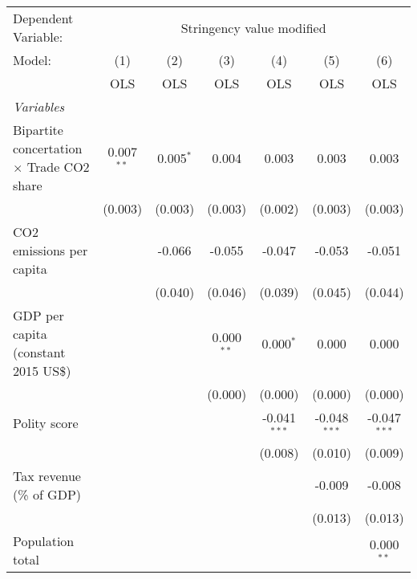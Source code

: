 
\begingroup
\centering
\begin{tabular}{lcccccc}
   \toprule
   Dependent Variable: & \multicolumn{6}{c}{Stringency value modified}\\
   Model:                                           & (1)          & (2)         & (3)          & (4)            & (5)            & (6)\\  
                                                    &  OLS         & OLS         & OLS          & OLS            & OLS            & OLS\\  
   \midrule
   \emph{Variables}\\
   Bipartite concertation $\times$ Trade CO2 share  & 0.007$^{**}$ & 0.005$^{*}$ & 0.004        & 0.003          & 0.003          & 0.003\\   
                                                    & (0.003)      & (0.003)     & (0.003)      & (0.002)        & (0.003)        & (0.003)\\   
   CO2 emissions per capita                         &              & -0.066      & -0.055       & -0.047         & -0.053         & -0.051\\   
                                                    &              & (0.040)     & (0.046)      & (0.039)        & (0.045)        & (0.044)\\   
   GDP per capita (constant 2015 US\$)              &              &             & 0.000$^{**}$ & 0.000$^{*}$    & 0.000          & 0.000\\   
                                                    &              &             & (0.000)      & (0.000)        & (0.000)        & (0.000)\\   
   Polity score                                     &              &             &              & -0.041$^{***}$ & -0.048$^{***}$ & -0.047$^{***}$\\   
                                                    &              &             &              & (0.008)        & (0.010)        & (0.009)\\   
   Tax revenue (\% of GDP)                          &              &             &              &                & -0.009         & -0.008\\   
                                                    &              &             &              &                & (0.013)        & (0.013)\\   
   Population total                                 &              &             &              &                &                & 0.000$^{**}$\\   

\end{tabular}
